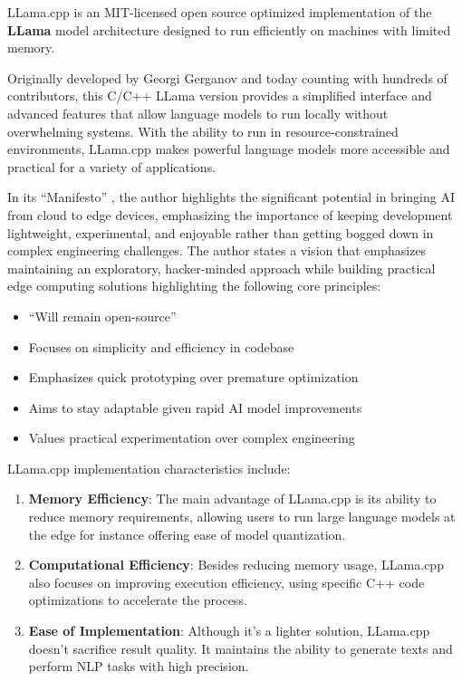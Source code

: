 LLama.cpp  is an MIT-licensed open source optimized implementation of the \textbf{LLama} model architecture designed to run efficiently on machines with limited memory.

Originally developed by Georgi Gerganov and today counting with hundreds of contributors, this C/C++ LLama version provides a simplified interface and advanced features that allow language models to run locally without overwhelming systems. With the ability to run in resource-constrained environments, LLama.cpp makes powerful language models more accessible and practical for a variety of applications.

In its ``Manifesto'' , the author highlights the significant potential in bringing AI from cloud to edge devices, emphasizing the importance of keeping development lightweight, experimental, and enjoyable rather than getting bogged down in complex engineering challenges. The author states a vision that emphasizes maintaining an exploratory, hacker-minded approach while building practical edge computing solutions highlighting the following core principles:

\begin{itemize}
    \item ``Will remain open-source''
    \item Focuses on simplicity and efficiency in codebase
    \item Emphasizes quick prototyping over premature optimization
    \item Aims to stay adaptable given rapid AI model improvements
    \item Values practical experimentation over complex engineering
\end{itemize}

LLama.cpp implementation characteristics include:

\begin{enumerate}
    \item \textbf{Memory Efficiency}: The main advantage of LLama.cpp is its ability to reduce memory requirements, allowing users to run large language models at the edge for instance offering ease of model quantization.

    \item \textbf{Computational Efficiency}: Besides reducing memory usage, LLama.cpp also focuses on improving execution efficiency, using specific C++ code optimizations to accelerate the process.

    \item \textbf{Ease of Implementation}: Although it's a lighter solution, LLama.cpp doesn't sacrifice result quality. It maintains the ability to generate texts and perform NLP tasks with high precision.
\end{enumerate}

